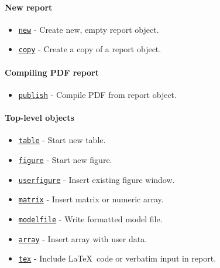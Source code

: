 

	\paragraph{New report}\label{new-report}

\begin{itemize}
\itemsep1pt\parskip0pt
\item
  \href{report/new}{\texttt{new}} - Create new, empty report object.
\item
  \href{report/copy}{\texttt{copy}} - Create a copy of a report object.
\end{itemize}

\paragraph{Compiling PDF report}\label{compiling-pdf-report}

\begin{itemize}
\itemsep1pt\parskip0pt
\item
  \href{report/publish}{\texttt{publish}} - Compile PDF from report
  object.
\end{itemize}

\paragraph{Top-level objects}\label{top-level-objects}

\begin{itemize}
\itemsep1pt\parskip0pt
\item
  \href{report/table}{\texttt{table}} - Start new table.
\item
  \href{report/figure}{\texttt{figure}} - Start new figure.
\item
  \href{report/userfigure}{\texttt{userfigure}} - Insert existing figure
  window.
\item
  \href{report/matrix}{\texttt{matrix}} - Insert matrix or numeric
  array.
\item
  \href{report/modelfile}{\texttt{modelfile}} - Write formatted model
  file.
\item
  \href{report/array}{\texttt{array}} - Insert array with user data.
\item
  \href{report/tex}{\texttt{tex}} - Include \LaTeX~code or verbatim
  input in report.
\end{itemize}

